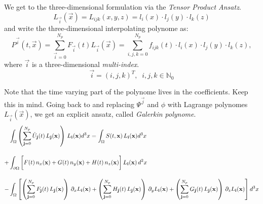 
We get to the three-dimensional formulation via the \emph{Tensor Product Ansatz}.
\newcommand{\LI}{L_{\vec{i}}(\vec{x})}
\begin{equation}
\label{eq-tensor-ansatz}
    \LI = L_{ijk}(x,y,z) = l_i(x) \cdot l_j(y) \cdot l_k(z)
\end{equation}
and write the three-dimensional interpolating polynome as:
\newcommand{\PI}{P^{\vec{i}}(t,\vec{x})}
\newcommand{\FI}{F_{\vec{i}}(t)}
\newcommand{\sumI}{\sum^{N_p}_{\vec{i}=0}}
\begin{equation}
\label{eq-tensor-ansatz-interpolant}
    \PI = \sumI \FI \LI = \sum^{N_p}_{i,j,k = 0} f_{ijk}(t) \cdot l_i(x) \cdot l_j(y) \cdot l_k(z),
\end{equation}
where $\vec{i}$ is a three-dimensional \emph{multi-index}.
\begin{equation}
    \vec{i} = (i,j,k)^T, \;\; i,j,k \in \mathbb{N}_0
\end{equation}

Note that the time varying part of the polynome lives in the coefficients.
Keep this in mind.
\newcommand{\FJ}{F_{\vec{j}}(t)}
\newcommand{\GJ}{G_{\vec{j}}(t)}
\newcommand{\HJ}{H_{\vec{j}}(t)}
\newcommand{\STX}{S(t,\vec{x})}
\newcommand{\UJ}{ \dot{U}_{\vec{j}}(t)}
\newcommand{\LJ}{L_{\vec{j}}(\vec{x})}
\newcommand{\sumJ}{\sum^{N_p}_{\vec{j}=0}}
\newcommand{\nx}{n_x(\vec{x})}
\newcommand{\ny}{n_y(\vec{x})}
\newcommand{\nz}{n_z(\vec{x})}
Going back to  and replacing $\Psi^{\vec{j}}$
and $\phi$ with Lagrange polynomes $\LI$, we get an explicit ansatz, called
\emph{Galerkin polynome}.
\begin{align}
     &\int_\Omega \left(\sumJ \UJ \, \LJ \right) \, \LI d^3x = \int_\Omega \STX \, \LI d^3x \nonumber \br
    +&\int_{\partial\Omega} \bigg[ F(t) \, \nx + G(t) \, \ny + H(t)\, \nz \bigg]\,\LI\, d^2x \br
    -&\int_\Omega \left[
          \left(\sumJ \FJ \, \LJ \right) \, \partial_x \LI 
        + \left(\sumJ \HJ \, \LJ \right) \, \partial_y \LI
        + \left(\sumJ \GJ \, \LJ \right) \, \partial_z \LI \right] d^3x \nonumber
\end{align}

\newcommand{\sumK}{\sum^{N_p}_{\vec{k}=0}}
\newcommand{\wK}{\omega_{\vec{k}}}

\newcommand{\STXK}{S(t,\vec{x}_{\vec{k}})}
\newcommand{\LIK}{L_{\vec{i}}(\vec{x}_{\vec{k}})}
\newcommand{\LJK}{L_{\vec{j}}(\vec{x}_{\vec{k}})}

